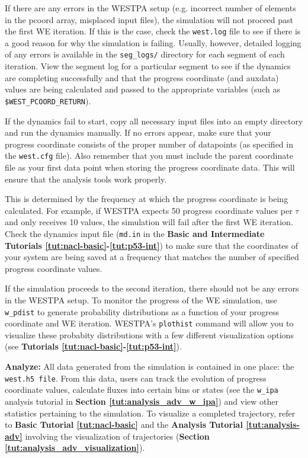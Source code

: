 If there are any errors in the WESTPA setup (e.g. incorrect number of elements in the pcoord array, misplaced input files), the simulation will not proceed past the first WE iteration. 
If this is the case, check the \verb|west.log| file to see if there is a good reason for why the simulation is failing. 
Usually, however, detailed logging of any errors is available in the \verb|seg_logs/| directory for each segment of each iteration. 
View the segment log for a particular segment to see if the dynamics are completing successfully and that the progress coordinate (and auxdata) values are being calculated and passed to the appropriate variables (such as \verb|$WEST_PCOORD_RETURN|).
\pagebreak

If the dynamics fail to start, copy all necessary input files into an empty directory and run the dynamics manually. 
If no errors appear, make sure that your progress coordinate consists of the proper number of datapoints (as specified in the \verb|west.cfg| file). Also remember that you must include the parent coordinate file as your first data point when storing the progress coordinate data. This will ensure that the analysis tools work properly.

This is determined by the frequency at which the progress coordinate is being calculated. 
For example, if WESTPA expects 50 progress coordinate values per $\tau$ and only receives 10 values, the simulation will fail after the first WE iteration. 
Check the dynamics input file (\verb|md.in| in the \textbf{Basic and Intermediate Tutorials \ref{tut:nacl-basic}-\ref{tut:p53-int}}) to make sure that the coordinates of your system are being saved at a frequency that matches the number of specified progress coordinate values.

If the simulation proceeds to the second iteration, there should not be any errors in the WESTPA setup. 
To monitor the progress of the WE simulation, use \verb|w_pdist| to generate probability distributions as a function of your progress coordinate and WE iteration. 
WESTPA’s \verb|plothist| command will allow you to visualize these probabity distributions with a few different visualization options (see \textbf{Tutorials \ref{tut:nacl-basic}-\ref{tut:p53-int}}).

\textbf{Analyze:} All data generated from the simulation is contained in one place: the \verb|west.h5 file|. 
From this data, users can track the evolution of progress coordinate values, calculate fluxes into certain bins or states (see the \verb|w_ipa| analysis tutorial in \textbf{Section \ref{tut:analysis_adv_w_ipa}}) and view other statistics pertaining to the simulation. 
To visualize a completed trajectory, refer to \textbf{Basic Tutorial \ref{tut:nacl-basic}} and the \textbf{Analysis Tutorial \ref{tut:analysis-adv}} involving the visualization of trajectories (\textbf{Section \ref{tut:analysis_adv_visualization}}).

